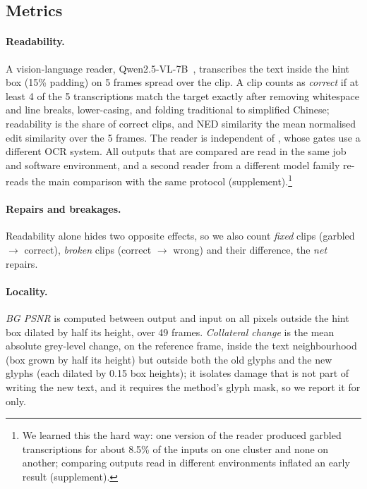 \subsection{Metrics}
\label{sec:metrics}
\paragraph{Readability.} A vision-language reader, Qwen2.5-VL-7B~\cite{bai2025qwen25vl}, transcribes the text inside the hint box (15\% padding) on 5 frames spread over the clip. A clip counts as \emph{correct} if at least 4 of the 5 transcriptions match the target exactly after removing whitespace and line breaks, lower-casing, and folding traditional to simplified Chinese; readability is the share of correct clips, and NED similarity the mean normalised edit similarity over the 5 frames. The reader is independent of \method, whose gates use a different OCR system. All outputs that are compared are read in the same job and software environment, and a second reader from a different model family re-reads the main comparison with the same protocol (supplement).\footnote{We learned this the hard way: one version of the reader produced garbled transcriptions for about 8.5\% of the inputs on one cluster and none on another; comparing outputs read in different environments inflated an early result (supplement).}

\paragraph{Repairs and breakages.} Readability alone hides two opposite effects, so we also count \emph{fixed} clips (garbled $\to$ correct), \emph{broken} clips (correct $\to$ wrong) and their difference, the \emph{net} repairs.

\paragraph{Locality.} \emph{BG PSNR} is computed between output and input on all pixels outside the hint box dilated by half its height, over 49 frames. \emph{Collateral change} is the mean absolute grey-level change, on the reference frame, inside the text neighbourhood (box grown by half its height) but outside both the old glyphs and the new glyphs (each dilated by 0.15 box heights); it isolates damage that is not part of writing the new text, and it requires the method's glyph mask, so we report it for \method only.

